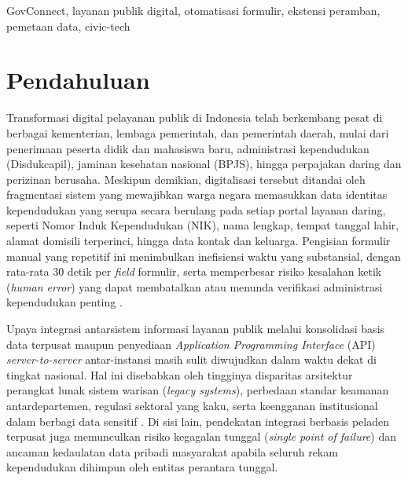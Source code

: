 \documentclass[conference]{IEEEtran}
\begin{document}
\begin{IEEEkeywords}
GovConnect, layanan publik digital, otomatisasi formulir, ekstensi peramban, pemetaan data, civic-tech
\end{IEEEkeywords}

\section{Pendahuluan}

Transformasi digital pelayanan publik di Indonesia telah berkembang pesat di berbagai kementerian, lembaga pemerintah, dan pemerintah daerah, mulai dari penerimaan peserta didik dan mahasiswa baru, administrasi kependudukan (Disdukcapil), jaminan kesehatan nasional (BPJS), hingga perpajakan daring dan perizinan berusaha. Meskipun demikian, digitalisasi tersebut ditandai oleh fragmentasi sistem yang mewajibkan warga negara memasukkan data identitas kependudukan yang serupa secara berulang pada setiap portal layanan daring, seperti Nomor Induk Kependudukan (NIK), nama lengkap, tempat tanggal lahir, alamat domisili terperinci, hingga data kontak dan keluarga. Pengisian formulir manual yang repetitif ini menimbulkan inefisiensi waktu yang substansial, dengan rata-rata 30 detik per \textit{field} formulir, serta memperbesar risiko kesalahan ketik (\textit{human error}) yang dapat membatalkan atau menunda verifikasi administrasi kependudukan penting \cite{OECD2023DGO}.

Upaya integrasi antarsistem informasi layanan publik melalui konsolidasi basis data terpusat maupun penyediaan \textit{Application Programming Interface} (API) \textit{server-to-server} antar-instansi masih sulit diwujudkan dalam waktu dekat di tingkat nasional. Hal ini disebabkan oleh tingginya disparitas arsitektur perangkat lunak sistem warisan (\textit{legacy systems}), perbedaan standar keamanan antardepartemen, regulasi sektoral yang kaku, serta keengganan institusional dalam berbagi data sensitif \cite{OECD2022Principles}. Di sisi lain, pendekatan integrasi berbasis peladen terpusat juga memunculkan risiko kegagalan tunggal (\textit{single point of failure}) dan ancaman kedaulatan data pribadi masyarakat apabila seluruh rekam kependudukan dihimpun oleh entitas perantara tunggal.
\end{document}
